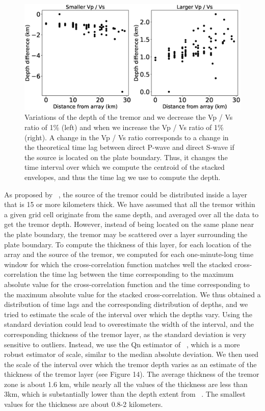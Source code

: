 \documentclass[draft]{agujournal2019}
\begin{document}
\begin{figure}
\noindent\includegraphics[width=\textwidth, trim={0cm 0cm 0cm 0cm},clip]{figures/PWS_PWS.eps}
\caption{Variations of the depth of the tremor and we decrease the Vp / Vs ratio of 1\% (left) and when we increase the Vp / Vs ratio of 1\% (right). A change in the Vp / Vs ratio corresponds to a change in the theoretical time lag between direct P-wave and direct S-wave if the source is located on the plate boundary. Thus, it changes the time interval over which we compute the centroid of the stacked envelopes, and thus the time lag we use to compute the depth.}
\label{pngfiguresample}
\end{figure}

As proposed by ~, the source of the tremor could be distributed inside a layer that is 15 or more kilometers thick. We have assumed that all the tremor within a given grid cell originate from the same depth, and averaged over all the data to get the tremor depth. However, instead of being located on the same plane near the plate boundary, the tremor may be scattered over a layer surrounding the plate boundary. To compute the thickness of this layer, for each location of the array and the source of the tremor, we computed for each one-minute-long time window for which the cross-correlation function matches well the stacked cross-correlation the time lag between the time corresponding to the maximum absolute value for the cross-correlation function and the time corresponding to the maximum absolute value for the stacked cross-correlation. We thus obtained a distribution of time lags and the corresponding distribution of depths, and we tried to estimate the scale of the interval over which the depths vary. Using the standard deviation could lead to overestimate the width of the interval, and the corresponding thickness of the tremor layer, as the standard deviation is very sensitive to outliers. Instead, we use the Qn estimator of ~, which is a more robust estimator of scale, similar to the median absolute deviation. We then used the scale of the interval over which the tremor depth varies as an estimate of the thickness of the tremor layer (see Figure 14). The average thickness of the tremor zone is about 1.6 km, while nearly all the values of the thickness are less than 3km, which is substantially lower than the depth extent from ~. The smallest values for the thickness are about 0.8-2 kilometers.
\end{document}
